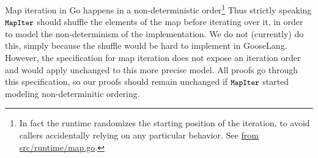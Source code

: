 Map iteration in Go happens in a non-deterministic order\footnote{In fact the
runtime randomizes the starting position of the iteration, to avoid callers
accidentally relying on any particular behavior. See
\href{https://github.com/golang/go/blob/c379c3d58d5482f4c8fe97466a99ce70e630ad44/src/runtime/map.go\#L844-L850}%
{ from src/runtime/map.go}.}
Thus strictly speaking $\cc{MapIter}$ should shuffle the elements of the map
before iterating over it, in order to model the non-determinism of the
implementation. We do not (currently) do this, simply because the shuffle would
be hard to implement in GooseLang. However, the specification for map iteration
does not expose an iteration order and would apply unchanged to this more
precise model. All proofs go through this specification, so our proofs should
remain unchanged if $\cc{MapIter}$ started modeling non-determinitic ordering.
